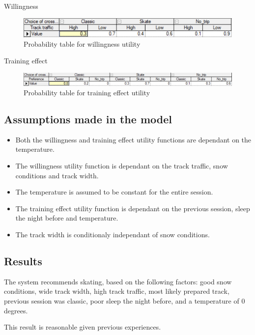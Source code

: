 \documentclass{article}
\begin{document}
\newpage

Willingness

\begin{figure}[h]
    \centering
    \includegraphics[width=\linewidth]{images/willingness.png}
    \caption{Probability table for willingness utility}
    \label{fig:image5}
\end{figure}

Training effect

\begin{figure}[h]
    \centering
    \includegraphics[width=\linewidth]{images/training_effect.png}
    \caption{Probability table for training effect utility}
    \label{fig:image6}
\end{figure}

\subsection*{Assumptions made in the model}

\begin{itemize}
    \item Both the willingness and training effect utility functions are dependant on the temperature.
    \item The willingness utility function is dependant on the track traffic, snow conditions and track width.
    \item The temperature is assumed to be constant for the entire session.
    \item The training effect utility function is dependant on the previous session, sleep the night before and temperature.
    \item The track width is conditionaly independant of snow conditions.
\end{itemize}

\subsection*{Results}

The system recommends skating, based on the following factors: good snow conditions, wide track width, high track traffic, most likely prepared track, previous session was classic, poor sleep the night before, and a temperature of 0 degrees.

\medskip

This result is reasonable given previous experiences.
\end{document}
